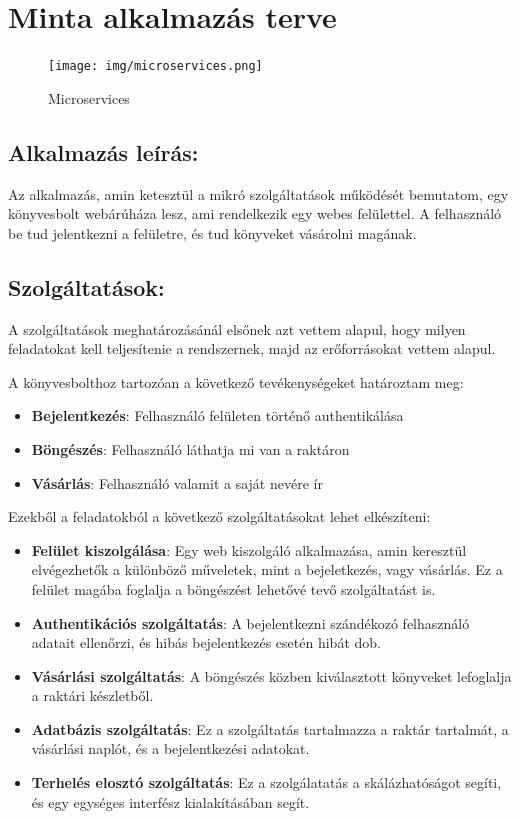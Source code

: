 \documentclass[11pt,magyar,a4paper,oneside,]{report}
\providecommand{\tightlist}{%
  \setlength{\itemsep}{0pt}\setlength{\parskip}{0pt}}
\begin{document}
\chapter{Minta alkalmazás terve}\label{minta-alkalmazuxe1s-terve}

\begin{figure}[htbp]
\centering
\texttt{[image: img/microservices.png]}
\caption{Microservices}
\end{figure}

\section{Alkalmazás leírás:}\label{alkalmazuxe1s-leuxedruxe1s}

Az alkalmazás, amin ketesztül a mikró szolgáltatások működését
bemutatom, egy könyvesbolt webárúháza lesz, ami rendelkezik egy webes
felülettel. A felhasználó be tud jelentkezni a felületre, és tud
könyveket vásárolni magának.

\section{Szolgáltatások:}\label{szolguxe1ltatuxe1sok}

A szolgáltatások meghatározásánál elsőnek azt vettem alapul, hogy milyen
feladatokat kell teljesítenie a rendszernek, majd az erőforrásokat
vettem alapul.

A könyvesbolthoz tartozóan a következő tevékenységeket határoztam meg:

\begin{itemize}
\tightlist
\item
  \textbf{Bejelentkezés}: Felhasználó felületen történő authentikálása
\item
  \textbf{Böngészés}: Felhasználó láthatja mi van a raktáron
\item
  \textbf{Vásárlás}: Felhasználó valamit a saját nevére ír
\end{itemize}

Ezekből a feladatokból a következő szolgáltatásokat lehet elkészíteni:

\begin{itemize}
\tightlist
\item
  \textbf{Felület kiszolgálása}: Egy web kiszolgáló alkalmazása, amin
  keresztül elvégezhetők a különböző műveletek, mint a bejeletkezés,
  vagy vásárlás. Ez a felület magába foglalja a böngészést lehetővé tevő
  szolgáltatást is.
\item
  \textbf{Authentikációs szolgáltatás}: A bejelentkezni szándékozó
  felhasználó adatait ellenőrzi, és hibás bejelentkezés esetén hibát
  dob.
\item
  \textbf{Vásárlási szolgáltatás}: A böngészés közben kiválasztott
  könyveket lefoglalja a raktári készletből.
\item
  \textbf{Adatbázis szolgáltatás}: Ez a szolgáltatás tartalmazza a
  raktár tartalmát, a vásárlási naplót, és a bejelentkezési adatokat.
\item
  \textbf{Terhelés elosztó szolgáltatás}: Ez a szolgálatatás a
  skálázhatóságot segíti, és egy egységes interfész kialakításában
  segít.
\end{itemize}
\end{document}
